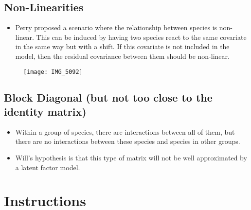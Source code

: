 \documentclass[12pt]{amsart}
\begin{document}
\subsection{Non-Linearities}

\begin{itemize}
\item Perry proposed a scenario where the relationship between species is non-linear. This can be induced by having two species react to the same covariate in the same way but with a shift. If this covariate is not included in the model, then the residual covariance between them should be non-linear.


\end{itemize}

\begin{figure}[H]
\texttt{[image: IMG\_5092]}
\end{figure}


\subsection{Block Diagonal (but not too close to the identity matrix)}

\begin{itemize}
\item Within a group of species, there are interactions between all of them, but there are no interactions between these species and species in other groups. 

\item Will's hypothesis is that this type of matrix will not be well approximated by a latent factor model. 
\end{itemize}

\section{Instructions}
\end{document}

